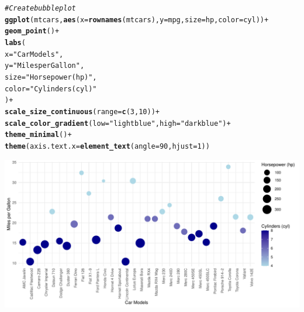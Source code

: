 \documentclass{article}\usepackage[]{graphicx}\usepackage[]{xcolor}
\makeatletter
\def\maxwidth{ %
  \ifdim\Gin@nat@width>\linewidth
    \linewidth
  \else
    \Gin@nat@width
  \fi
}
\newcommand{\hlnum}[1]{\textcolor[rgb]{0.686,0.059,0.569}{#1}}%
\newcommand{\hlstr}[1]{\textcolor[rgb]{0.192,0.494,0.8}{#1}}%
\newcommand{\hlcom}[1]{\textcolor[rgb]{0.678,0.584,0.686}{\textit{#1}}}%
\newcommand{\hlopt}[1]{\textcolor[rgb]{0,0,0}{#1}}%
\newcommand{\hlstd}[1]{\textcolor[rgb]{0.345,0.345,0.345}{#1}}%
\newcommand{\hlkwc}[1]{\textcolor[rgb]{0.333,0.667,0.333}{#1}}%
\newcommand{\hlkwd}[1]{\textcolor[rgb]{0.737,0.353,0.396}{\textbf{#1}}}%
\newenvironment{kframe}{%
 \def\at@end@of@kframe{}%
 \ifinner\ifhmode%
  \def\at@end@of@kframe{\end{minipage}}%
  \begin{minipage}{\columnwidth}%
 \fi\fi%
 \def\FrameCommand##1{\hskip\@totalleftmargin \hskip-\fboxsep
 \colorbox{shadecolor}{##1}\hskip-\fboxsep
     \hskip-\linewidth \hskip-\@totalleftmargin \hskip\columnwidth}%
 \MakeFramed {\advance\hsize-\width
   \@totalleftmargin\z@ \linewidth\hsize
   \@setminipage}}%
 {\par\unskip\endMakeFramed%
 \at@end@of@kframe}
\newenvironment{knitrout}{}{} %
\makeatother
\begin{document}
\begin{knitrout}\scriptsize
{}\color{fgcolor}\begin{kframe}
\begin{alltt}
\hlcom{#Create bubble plot }
\hlkwd{ggplot}\hlstd{(mtcars,} \hlkwd{aes}\hlstd{(}\hlkwc{x} \hlstd{=} \hlkwd{rownames}\hlstd{(mtcars),} \hlkwc{y} \hlstd{= mpg,} \hlkwc{size} \hlstd{= hp,} \hlkwc{color} \hlstd{= cyl))} \hlopt{+}
  \hlkwd{geom_point}\hlstd{()} \hlopt{+}
  \hlkwd{labs}\hlstd{(}
    \hlkwc{x} \hlstd{=} \hlstr{"Car Models"}\hlstd{,}
    \hlkwc{y} \hlstd{=} \hlstr{"Miles per Gallon"}\hlstd{,}
    \hlkwc{size} \hlstd{=} \hlstr{"Horsepower (hp)"}\hlstd{,}
    \hlkwc{color} \hlstd{=} \hlstr{"Cylinders (cyl)"}
  \hlstd{)} \hlopt{+}
  \hlkwd{scale_size_continuous}\hlstd{(}\hlkwc{range} \hlstd{=} \hlkwd{c}\hlstd{(}\hlnum{3}\hlstd{,} \hlnum{10}\hlstd{))} \hlopt{+}
  \hlkwd{scale_color_gradient}\hlstd{(}\hlkwc{low} \hlstd{=} \hlstr{"lightblue"}\hlstd{,} \hlkwc{high} \hlstd{=} \hlstr{"darkblue"}\hlstd{)} \hlopt{+}
  \hlkwd{theme_minimal}\hlstd{()} \hlopt{+}
  \hlkwd{theme}\hlstd{(}\hlkwc{axis.text.x} \hlstd{=} \hlkwd{element_text}\hlstd{(}\hlkwc{angle} \hlstd{=} \hlnum{90}\hlstd{,} \hlkwc{hjust} \hlstd{=}\hlnum{1}\hlstd{))}
\end{alltt}
\end{kframe}

{\centering \includegraphics[width=\maxwidth]{figure/beamer-buble-plot-chunk-1} 

}


\end{knitrout}
\end{document}
